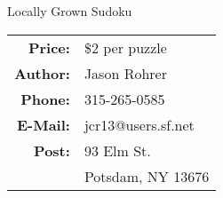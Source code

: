 \documentclass[12pt]{article}
\begin{document}
\begin{center}
{\Huge Locally Grown Sudoku}

\vspace{1in}

{\Large
\begin{tabular}{rl}
{\bf Price:} & \$2 per puzzle\\
{\bf Author:} & Jason Rohrer\\
{\bf Phone:} & 315-265-0585\\
{\bf E-Mail:} & jcr13@users.sf.net\\
{\bf Post:} & 93 Elm St.\\
            & Potsdam, NY 13676\\

\end{tabular} 
}

\end{center}
\end{document}
